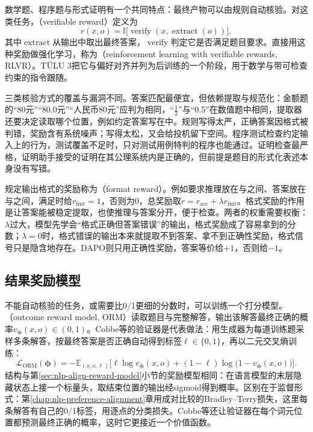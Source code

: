 数学题、程序题与形式证明有一个共同特点：最终产物可以由规则自动核验。对这类任务，（verifiable reward）定义为
\begin{equation}
  r(x,o)=\mathbb I\bigl[\operatorname{verify}(x,\operatorname{extract}(o))\bigr],
  \label{eq:nlp-reasoning-verifiable-reward}
\end{equation}
其中$\operatorname{extract}$从输出中取出最终答案，$\operatorname{verify}$判定它是否满足题目要求。直接用这种奖励做强化学习，称为（reinforcement learning with verifiable rewards, RLVR）。TÜLU 3把它与偏好对齐并列为后训练的一个阶段，用于数学与带可检查约束的指令跟随。

三类核验方式的覆盖与漏洞不同。答案匹配最便宜，但依赖提取与规范化：金额题的“80元”“80.0元”“人民币80元”应判为相同，“$\frac{1}{2}$”与“0.5”在数值题中相同，提取器还要决定读取哪个位置，例如约定答案写在中。规则写得太严，正确答案因格式被判错，奖励含有系统噪声；写得太松，又会给投机留下空间。程序测试检查约定输入上的行为，测试覆盖不足时，只对测试用例特判的程序也能通过。证明检查最严格，证明助手接受的证明在其公理系统内是正确的，但前提是题目的形式化表述本身没有写错。

规定输出格式的奖励称为（format reward）。例如要求推理放在与之间、答案放在与之间，满足时给$r_{\mathrm{fmt}}=1$，否则为0，总奖励取$r=r_{\mathrm{acc}}+\lambda r_{\mathrm{fmt}}$。格式奖励的作用是让答案能被稳定提取，也使推理与答案分开，便于检查。两者的权重需要权衡：$\lambda$过大，模型先学会“格式正确但答案错误”的输出，格式奖励成了容易拿到的分数；$\lambda=0$时，格式错误的输出本来就提取不到答案、拿不到正确性奖励，格式信号只是隐含地存在。DAPO则只用正确性奖励，答案等价给$+1$，否则给$-1$。

\subsection{结果奖励模型}
\label{sec:nlp-reasoning-orm}

不能自动核验的任务，或需要比0/1更细的分数时，可以训练一个打分模型。（outcome reward model, ORM）读取题目与完整解答，输出该解答最终正确的概率$v_{\bm\phi}(x,o)\in(0,1)$。Cobbe等的验证器是代表做法：用生成器为每道训练题采样多条解答，按最终答案是否正确自动得到标签$\ell\in\{0,1\}$，再以二元交叉熵训练：
\begin{equation}
  \mathcal L_{\mathrm{ORM}}(\bm\phi)
  =-\mathbb E_{(x,o,\ell)}\bigl[\ell\log v_{\bm\phi}(x,o)+(1-\ell)\log\bigl(1-v_{\bm\phi}(x,o)\bigr)\bigr].
  \label{eq:nlp-reasoning-orm}
\end{equation}
结构与第\ref{sec:nlp-align-reward-model}小节的奖励模型相同：在语言模型的末层隐藏状态上接一个标量头，取结束位置的输出经sigmoid得到概率。区别在于监督形式：第\ref{chap:nlp-preference-alignment}章用成对比较的Bradley--Terry损失，这里每条解答有自己的0/1标签，用逐点的分类损失。Cobbe等还让验证器在每个词元位置都预测最终正确的概率，这时它更接近一个价值函数。

